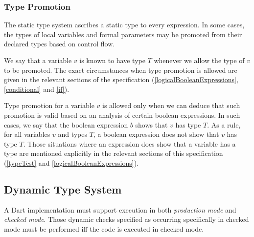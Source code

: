 \documentclass{article}
\begin{document}


\subsubsection{Type Promotion}

\LMHash{}
The static type system ascribes a static type to every expression.
In some cases, the types of local variables and formal parameters may be promoted from their declared types based on control flow.

\LMHash{}
We say that a variable $v$ is known to have type $T$ whenever we allow the type of $v$ to be promoted.
The exact circumstances when type promotion is allowed are given in the relevant sections of the specification (\ref{logicalBooleanExpressions}, \ref{conditional} and \ref{if}).

\LMHash{}
Type promotion for a variable $v$ is allowed only when we can deduce that such promotion is valid based on an analysis of certain boolean expressions.
In such cases, we say that the boolean expression $b$ shows that $v$ has type $T$.
As a rule, for all variables $v$ and types $T$, a boolean expression does not show that $v$ has type $T$.
Those situations where an expression does show that a variable has a type are mentioned explicitly in the relevant sections of this specification (\ref{typeTest} and \ref{logicalBooleanExpressions}).


\subsection{Dynamic Type System}

\LMHash{}
A Dart implementation must support execution in both {\em production mode} and {\em checked mode}.
Those dynamic checks specified as occurring specifically in checked mode must be performed if{}f the code is executed in checked mode.
\end{document}
